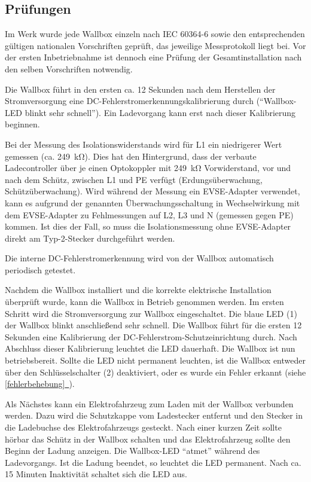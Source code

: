 \documentclass[a4paper,10pt]{article}
\newcommand*{\fullref}[1]{\hyperref[{#1}]{\ref*{#1}~\nameref*{#1}}}
\begin{document}
\begin{multicols*}{2}
	\subsection{Prüfungen}\label{tests}
	Im Werk wurde jede Wallbox einzeln nach IEC 60364-6 sowie den entsprechenden gültigen
	nationalen Vorschriften geprüft, das jeweilige Messprotokoll liegt bei.
	Vor der ersten Inbetriebnahme ist dennoch eine Prüfung der Gesamtinstallation
	nach den selben Vorschriften notwendig.

	Die Wallbox führt in den ersten ca. 12 Sekunden nach dem Herstellen der Stromversorgung
	eine DC-Fehlerstromerkennungskalibrierung durch (\enquote{Wallbox-LED blinkt sehr schnell}).
	Ein Ladevorgang kann erst nach dieser Kalibrierung beginnen.

	Bei der Messung des Isolationswiderstands wird für L1 ein niedrigerer Wert
	gemessen (ca. \SI{249}{\kilo\ohm}). Dies hat den Hintergrund, dass
	der verbaute Ladecontroller über je einen Optokoppler mit
	\SI{249}{\kilo\ohm} Vorwiderstand, vor und nach dem Schütz, zwischen L1 und
	PE verfügt (Erdungsüberwachung, Schützüberwachung). Wird während der Messung ein EVSE-Adapter verwendet,
	kann es aufgrund der genannten Überwachungsschaltung in Wechselwirkung mit dem EVSE-Adapter zu Fehlmessungen
	auf L2, L3 und N (gemessen gegen PE) kommen. Ist dies der Fall, so muss die Isolationsmessung
	ohne EVSE-Adapter direkt am Typ-2-Stecker durchgeführt werden.

	Die interne DC-Fehlerstromerkennung wird von der Wallbox automatisch
	periodisch getestet.
	
	Nachdem die Wallbox installiert
	und die korrekte elektrische Installation überprüft wurde, kann die Wallbox in
	Betrieb genommen werden.
	Im ersten Schritt wird die Stromversorgung zur Wallbox eingeschaltet. Die
	blaue LED (1) der Wallbox blinkt anschließend sehr schnell. Die Wallbox führt
	für die ersten 12 Sekunden eine Kalibrierung der
	DC-Fehlerstrom-Schutzeinrichtung durch. Nach Abschluss dieser Kalibrierung
	leuchtet die LED dauerhaft. Die Wallbox ist nun betriebsbereit. Sollte die LED
	nicht permanent leuchten, ist die Wallbox entweder über den Schlüsselschalter (2) deaktiviert,
	oder es wurde ein Fehler erkannt (siehe \fullref{fehlerbehebung}).

	Als Nächstes kann ein Elektrofahrzeug zum Laden mit der Wallbox verbunden
	werden. Dazu wird die Schutzkappe vom Ladestecker entfernt und den Stecker in die
	Ladebuchse des Elektrofahrzeugs gesteckt. Nach einer kurzen Zeit sollte hörbar
	das Schütz in der Wallbox schalten und das Elektrofahrzeug sollte den Beginn
	der Ladung anzeigen. Die Wallbox-LED \enquote{atmet} während des
	Ladevorgangs. Ist die Ladung beendet, so leuchtet die LED permanent. Nach ca.
	15 Minuten Inaktivität schaltet sich die LED aus.


\end{multicols*}
\end{document}

